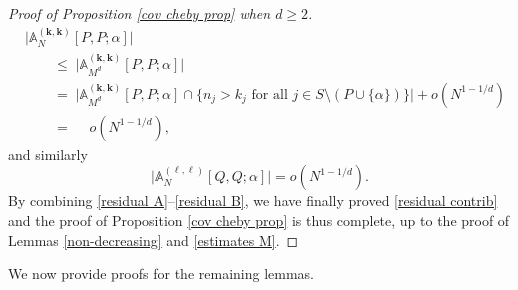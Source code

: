 \documentclass[a4paper,11pt]{article}
\numberwithin{equation}{section}
\theoremstyle{definition}
\newcommand{\eq}{\begin{equation}}
\newcommand{\qe}{\end{equation}}
\newcommand{\bs}{\boldsymbol}
\renewcommand{\leq}{\leqslant}
\renewcommand{\geq}{\geqslant}
\begin{document}
\begin{proof}[Proof of Proposition \ref{cov cheby prop} when $d\geq 2$]
\begin{align}
& \big | \mathbb A_{N}^{(\bs k,\bs k)}[P,P;\alpha] \big |\nonumber\\
 & \qquad \leq \; \big | \mathbb A_{M^d}^{(\bs k,\bs k)}[P,P;\alpha] \big | \nonumber\\
  &\qquad =  \; \big | \mathbb A_{M^d}^{(\bs k,\bs k)}[P,P;\alpha]\cap\big\{n_j>k_j \mbox{ for all }j\in S\setminus (P\cup\{\alpha\})\big\}\big |+o(N^{1-1/d})\nonumber\\
 & \qquad = \; \quad o(N^{1-1/d}),
\end{align}
and similarly
\eq
\label{residual B}
\big |\mathbb A_{N}^{(\bs \ell,\bs \ell)}[Q,Q;\alpha] \big |= o(N^{1- 1/d}).
\qe
By combining \eqref{residual A}--\eqref{residual B}, we have finally proved \eqref{residual contrib} and the proof of Proposition \ref{cov cheby prop} is thus complete, up to the proof of Lemmas \ref{non-decreasing} and \ref{estimates M}.
\end{proof}

We now provide proofs for the remaining lemmas.
\end{document}

